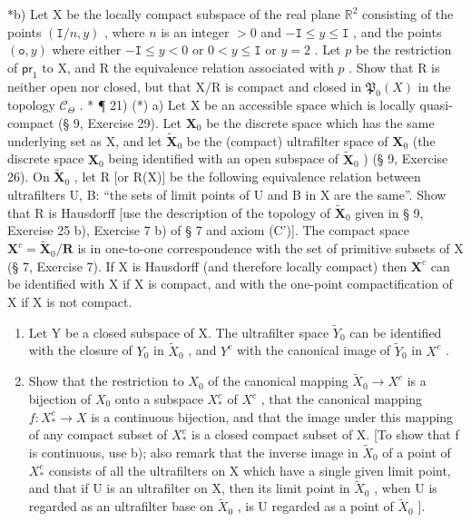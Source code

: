 *b) Let X be the locally compact subspace of the real plane \(\mathbb{R}^2\) consisting of the points \((\mathtt{I}/n, y)\) , where \(n\) is an integer \(>0\) and \(-\mathtt{I} \leqslant y \leqslant \mathtt{I}\) , and the points \((\mathtt{o}, y)\) where either \(-\mathtt{I} \leqslant y < 0\) or \(0 < y \leqslant \mathtt{I}\) or \(y = 2\) . Let \(p\) be the restriction of \(\mathsf{pr}_1\) to X, and R the equivalence relation associated with \(p\) . Show that R is neither open nor closed, but that X/R is compact and closed in \(\mathfrak{P}_0(X)\) in the topology \(\mathcal{C}_{\Theta}\) . * ¶ 21) (*) a) Let X be an accessible space which is locally quasi-compact (§ 9, Exercise 29). Let \(\mathbf{X}_0\) be the discrete space which has the same underlying set as X, and let \(\tilde{\mathbf{X}}_0\) be the (compact) ultrafilter space of \(\mathbf{X}_0\) (the discrete space \(\mathbf{X}_0\) being identified with an open subspace of \(\tilde{\mathbf{X}}_0\) ) (§ 9, Exercise 26). On \(\tilde{\mathbf{X}}_0\) , let R {[}or R(X){]} be the following equivalence relation between ultrafilters U, B: ``the sets of limit points of U and B in X are the same''. Show that R is Hausdorff {[}use the description of the topology of \(\tilde{\mathbf{X}}_0\) given in § 9, Exercise 25 b), Exercise 7 b) of § 7 and axiom (C'){]}. The compact space \(\mathbf{X}^c = \tilde{\mathbf{X}}_0 / \mathbf{R}\) is in one-to-one correspondence with the set of primitive subsets of X (§ 7, Exercise 7). If X is Hausdorff (and therefore locally compact) then \(\mathbf{X}^c\) can be identified with X if X is compact, and with the one-point compactification of X if X is not compact.

\begin{enumerate}
\def\labelenumi{\alph{enumi})}
\setcounter{enumi}{1}
\item
  Let Y be a closed subspace of X. The ultrafilter space \(\tilde{Y}_{0}\) can be identified with the closure of \(Y_{0}\) in \(\tilde{X}_{0}\) , and \(Y^{c}\) with the canonical image of \(\tilde{Y}_{0}\) in \(X^{c}\) .
\item
  Show that the restriction to \(X_{0}\) of the canonical mapping \(\tilde{X}_{0} \rightarrow X^{c}\) is a bijection of \(X_{0}\) onto a subspace \(X_{*}^{c}\) of \(X^{c}\) , that the canonical mapping \(f: X_{*}^{c} \rightarrow X\) is a continuous bijection, and that the image under this mapping of any compact subset of \(X_{*}^{c}\) is a closed compact subset of X. {[}To show that f is continuous, use b); also remark that the inverse image in \(\tilde{X}_{0}\) of a point of \(X_{*}^{c}\) consists of all the ultrafilters on X which have a single given limit point, and that if U is an ultrafilter on X, then its limit point in \(\tilde{X}_{0}\) , when U is regarded as an ultrafilter base on \(\tilde{X}_{0}\) , is U regarded as a point of \(\tilde{X}_{0}\) {]}.
\end{enumerate}

